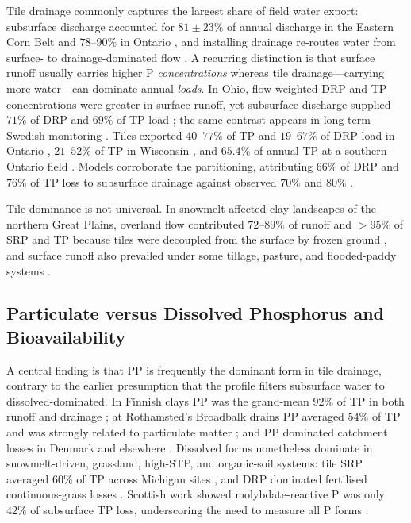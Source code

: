 Tile drainage commonly captures the largest share of field water export:
subsurface discharge accounted for $81\pm23\%$ of annual discharge in the
Eastern Corn Belt \parencite{Pease2018} and $78$--$90\%$ in Ontario
\parencite{VanEsbroeck2016}, and installing drainage re-routes water from
surface- to drainage-dominated flow \parencite{Turtola1995,BENGTSON1995}. A
recurring distinction is that surface runoff usually carries higher P
\emph{concentrations} whereas tile drainage---carrying more water---can
dominate annual \emph{loads}. In Ohio, flow-weighted DRP and TP
concentrations were greater in surface runoff, yet subsurface discharge
supplied $71\%$ of DRP and $69\%$ of TP load \parencite{Pease2018}; the same
contrast appears in long-term Swedish monitoring \parencite{Norberg2022}.
Tiles exported $40$--$77\%$ of TP and $19$--$67\%$ of DRP load in Ontario
\parencite{VanEsbroeck2016}, $21$--$52\%$ of TP in Wisconsin
\parencite{Madison2014}, and $65.4\%$ of annual TP at a southern-Ontario
field \parencite{Qi2018}. Models corroborate the partitioning, attributing
$66\%$ of DRP and $76\%$ of TP loss to subsurface drainage against observed
$70\%$ and $80\%$ \parencite{Grewal2025,Sadhukhan2019b}.

Tile dominance is not universal. In snowmelt-affected clay landscapes of the
northern Great Plains, overland flow contributed $72$--$89\%$ of runoff and
$>95\%$ of SRP and TP because tiles were decoupled from the surface by
frozen ground \parencite{Kokulan2019b,Kokulan2021}, and surface runoff also
prevailed under some tillage, pasture, and flooded-paddy systems
\parencite{Zhao2001,Melland2008,DarziNaftchali2016}.

\subsection{Particulate versus Dissolved Phosphorus and Bioavailability}

A central finding is that PP is frequently the dominant form in tile
drainage, contrary to the earlier presumption that the profile filters
subsurface water to dissolved-dominated. In Finnish clays PP was the
grand-mean $92\%$ of TP in both runoff and drainage \parencite{Uusitalo2001};
at Rothamsted's Broadbalk drains PP averaged $54\%$ of TP and was strongly
related to particulate matter \parencite{Lu2003,Lu2004}; and PP dominated
catchment losses in Denmark and elsewhere
\parencite{Grant1996,Brendel2019,vanderSalm2012}. Dissolved forms
nonetheless dominate in snowmelt-driven, grassland, high-STP, and
organic-soil systems: tile SRP averaged $60\%$ of TP across Michigan sites
\parencite{Clement2017}, and DRP dominated fertilised continuous-grass
losses \parencite{Zhang2015b}. Scottish work showed molybdate-reactive P was
only $42\%$ of subsurface TP loss, underscoring the need to measure all P
forms \parencite{Hooda1999}.

